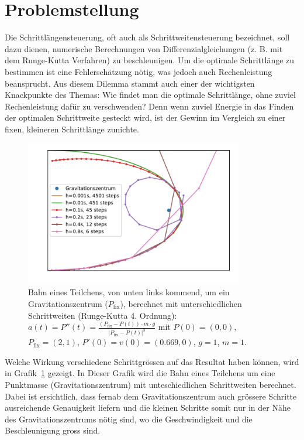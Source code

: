 %
%
%
\section{Problemstellung
\label{steps:section:problemstellung}}
Die Schrittlängensteuerung, oft auch als Schrittweitensteuerung bezeichnet,
soll dazu dienen, numerische Berechnungen von Differenzialgleichungen (z. B. mit dem Runge-Kutta Verfahren) zu beschleunigen.
Um die optimale Schrittlänge zu bestimmen ist eine Fehlerschätzung nötig,
was jedoch auch Rechenleistung beansprucht.
Aus diesem Dilemma stammt auch einer der wichtigsten Knackpunkte des Themas:
Wie findet man die optimale Schrittlänge, ohne zuviel Rechenleistung dafür zu verschwenden?
Denn wenn zuviel Energie in das Finden der optimalen Schrittweite gesteckt wird,
ist der Gewinn im Vergleich zu einer fixen, kleineren Schrittlänge zunichte.

\begin{figure}
\centering
\includegraphics[width=0.85\textwidth]{papers/steps/img/gravity_different_fixed_stepsize.pdf}
\caption{Bahn eines Teilchens, von unten links kommend,
um ein Gravitationszentrum ($P_\text{fix}$), berechnet mit unterschiedlichen Schrittweiten (Runge-Kutta 4. Ordnung):
$a(t)=P''(t)=\frac{(P_\text{fix}-P(t))\cdot m\cdot g}{|P_\text{fix}-P(t)|^{3}}$
mit $P(0)=(0, 0)$, $P_\text{fix}=(2, 1)$, $P'(0)=v(0)=(0.669, 0)$, $g=1$, $m=1$.
\label{buch:steps:fixed_comparison}}
\end{figure}

Welche Wirkung verschiedene Schrittgrössen
auf das Resultat haben können, wird in Grafik~\ref{buch:steps:fixed_comparison} gezeigt.
In Dieser Grafik wird die Bahn eines Teilchens um eine Punktmasse (Gravitationszentrum)
mit unteschiedlichen Schrittweiten berechnet.
Dabei ist ersichtlich, dass fernab dem Gravitationszentrum auch grössere Schritte
ausreichende Genauigkeit liefern und die kleinen Schritte somit nur in der Nähe des Gravitationszentrums
nötig sind, wo die Geschwindigkeit und die Beschleunigung gross sind.





